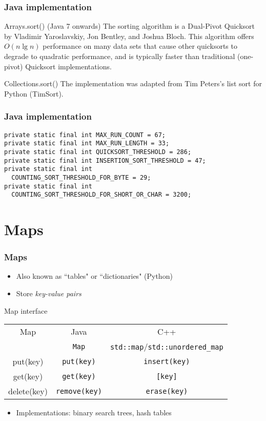 \documentclass{beamer}
\begin{document}
\begin{frame}
 \frametitle{Java implementation}
 \begin{block}{Arrays.sort() (Java 7 onwards)}
The sorting algorithm is a Dual-Pivot Quicksort by Vladimir
Yaroslavskiy, Jon Bentley, and Joshua Bloch. This algorithm offers
$O(n \lg n)$ performance on many data sets that cause other quicksorts
to degrade to quadratic performance, and is typically faster than
traditional (one-pivot) Quicksort implementations.
 \end{block}
 \begin{block}{Collections.sort()}
The implementation was adapted from Tim Peters's list sort for Python
(TimSort).
 \end{block}
\end{frame}

\begin{frame}[fragile]
 \frametitle{Java implementation}
 \begin{verbatim}
private static final int MAX_RUN_COUNT = 67;
private static final int MAX_RUN_LENGTH = 33;
private static final int QUICKSORT_THRESHOLD = 286;
private static final int INSERTION_SORT_THRESHOLD = 47;
private static final int
  COUNTING_SORT_THRESHOLD_FOR_BYTE = 29;
private static final int
  COUNTING_SORT_THRESHOLD_FOR_SHORT_OR_CHAR = 3200;
 \end{verbatim}
\end{frame}

\section{Maps}

\begin{frame}
 \frametitle{Maps}
 \begin{itemize}
  \item Also known as ``tables" or ``dictionaries" (Python)
  \item Store \emph{key-value pairs}
 \end{itemize}
 \begin{center}
 Map interface \\
 \vspace{0.5cm}
 \begin{tabular}{c|c|c}
  Map & Java & C++ \\
  & \texttt{Map} & \texttt{std::map}/\texttt{std::unordered\_map} \\
  \hline
  put(key) & \texttt{put(key)} & \texttt{insert(key)} \\
  get(key) & \texttt{get(key)} & \texttt{[key]} \\
  delete(key) & \texttt{remove(key)} & \texttt{erase(key)} \\
 \end{tabular}
 \end{center}
 \begin{itemize}
  \item Implementations: binary search trees, hash tables
 \end{itemize}
\end{frame}
\end{document}
